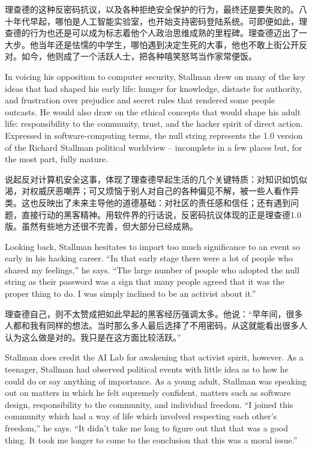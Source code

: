 \ifdefined\chs
理查德的这种反密码抗议，以及各种拒绝安全保护的行为，最终还是要失败的。八十年代早起，哪怕是人工智能实验室，也开始支持密码登陆系统。可即便如此，理查德的行为也还是可以成为标志着他个人政治思维成熟的里程碑。理查德迈出了一大步。他当年还是怯懦的中学生，哪怕遇到决定生死的大事，他也不敢上街公开反对。如今，他则成了一个活跃人士，把各种嘻笑怒骂当作家常便饭。
\fi

\ifdefined\eng
In voicing his opposition to computer security, Stallman drew on many of the key ideas that had shaped his early life: hunger for knowledge, distaste for authority, and frustration over prejudice and secret rules that rendered some people outcasts. He would also draw on the ethical concepts that would shape his adult life: responsibility to the community, trust, and the hacker spirit of direct action. Expressed in software-computing terms, the null string represents the 1.0 version of the Richard Stallman political worldview -- incomplete in a few places but, for the most part, fully mature.
\fi

\ifdefined\chs
说起反对计算机安全这事，体现了理查德早起生活的几个关键特质：对知识如饥似渴，对权威厌恶嘲弄；可又烦恼于别人对自己的各种偏见不解，被一些人看作异类。这也反映出了未来主导他的道德基础：对社区的责任感和信任；还有遇到问题，直接行动的黑客精神。用软件界的行话说，反密码抗议体现的正是理查德1.0版。虽然有些地方还很不完善，但大部分已经成熟。
\fi

\ifdefined\eng
Looking back, Stallman hesitates to impart too much significance to an event so early in his hacking career. ``In that early stage there were a lot of people who shared my feelings,'' he says. ``The large number of people who adopted the null string as their password was a sign that many people agreed that it was the proper thing to do. I was simply inclined to be an activist about it.''
\fi

\ifdefined\chs
理查德自己，则不太赞成把如此早起的黑客经历强调太多。他说：“早年间，很多人都和我有同样的想法。当时那么多人最后选择了不用密码，从这就能看出很多人认为这么做是对的。我只是在这方面比较活跃。”
\fi

\ifdefined\eng
Stallman does credit the AI Lab for awakening that activist spirit, however. As a teenager, Stallman had observed political events with little idea as to how he could do or say anything of importance. As a young adult, Stallman was speaking out on matters in which he felt supremely confident, matters such as software design, responsibility to the community, and individual freedom. ``I joined this community which had a way of life which involved respecting each other's freedom,'' he says. ``It didn't take me long to figure out that that was a good thing. It took me longer to come to the conclusion that this was a moral issue.''
\fi

